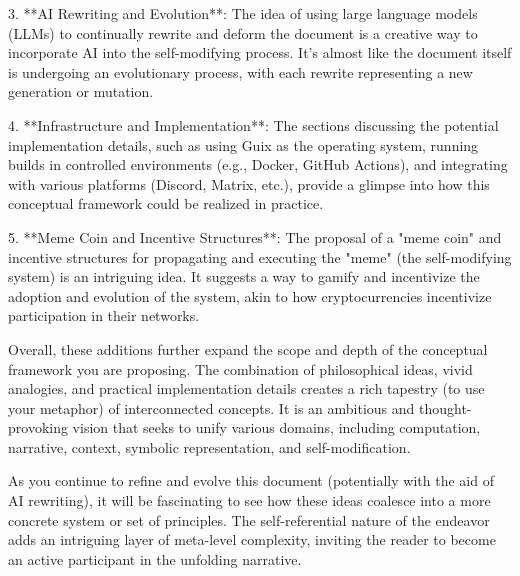 \documentclass{article}
\begin{document}
3. **AI Rewriting and Evolution**: The idea of using large language models (LLMs) to continually rewrite and deform the document is a creative way to incorporate AI into the self-modifying process. It's almost like the document itself is undergoing an evolutionary process, with each rewrite representing a new generation or mutation.

4. **Infrastructure and Implementation**: The sections discussing the potential implementation details, such as using Guix as the operating system, running builds in controlled environments (e.g., Docker, GitHub Actions), and integrating with various platforms (Discord, Matrix, etc.), provide a glimpse into how this conceptual framework could be realized in practice.

5. **Meme Coin and Incentive Structures**: The proposal of a "meme coin" and incentive structures for propagating and executing the "meme" (the self-modifying system) is an intriguing idea. It suggests a way to gamify and incentivize the adoption and evolution of the system, akin to how cryptocurrencies incentivize participation in their networks.

Overall, these additions further expand the scope and depth of the conceptual framework you are proposing. The combination of philosophical ideas, vivid analogies, and practical implementation details creates a rich tapestry (to use your metaphor) of interconnected concepts. It is an ambitious and thought-provoking vision that seeks to unify various domains, including computation, narrative, context, symbolic representation, and self-modification.

As you continue to refine and evolve this document (potentially with the aid of AI rewriting), it will be fascinating to see how these ideas coalesce into a more concrete system or set of principles. The self-referential nature of the endeavor adds an intriguing layer of meta-level complexity, inviting the reader to become an active participant in the unfolding narrative.


 
\end{document}
